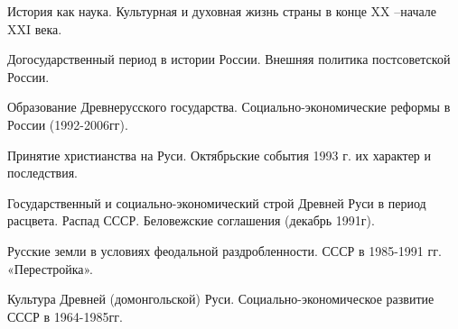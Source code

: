 \documentclass[
	14pt,
	a4paper,
	]
	{scrartcl}
\begin{document}
\shapk
{}
\setcounter{zad}{0}

\vfill
\z 	История как наука.
 \vfill
\z 	Культурная и духовная жизнь страны в конце XX –начале XXI века. \vfill

\vfill

\newpage


\shapk
{}
\setcounter{zad}{0}

\vfill
\z 	Догосударственный период в истории России.
 \vfill
\z 	Внешняя политика постсоветской России.
 \vfill

\vfill

\newpage


\shapk
{}
\setcounter{zad}{0}

\vfill
\z 	Образование Древнерусского государства.
 \vfill
\z 	Социально-экономические реформы в России (1992-2006гг).
 \vfill

\vfill

\newpage


\shapk
{}
\setcounter{zad}{0}

\vfill
\z 	Принятие христианства на Руси.
 \vfill
\z 	Октябрьские события 1993 г. их характер и последствия.
 \vfill

\vfill

\newpage


\shapk
{}
\setcounter{zad}{0}

\vfill
\z 	Государственный и социально-экономический строй Древней Руси в период расцвета.
 \vfill
\z 	Распад СССР. Беловежские соглашения (декабрь 1991г).
 \vfill

\vfill

\newpage


\shapk
{}
\setcounter{zad}{0}

\vfill
\z 	Русские земли в условиях феодальной раздробленности.
 \vfill
\z 	СССР в 1985-1991 гг. «Перестройка».
 \vfill

\vfill

\newpage


\shapk
{}
\setcounter{zad}{0}

\vfill
\z 	Культура Древней (домонгольской) Руси.
 \vfill
\z 	Социально-экономическое развитие СССР в 1964-1985гг.
 \vfill

\vfill

\newpage


\shapk
{}
\setcounter{zad}{0}
\end{document}
